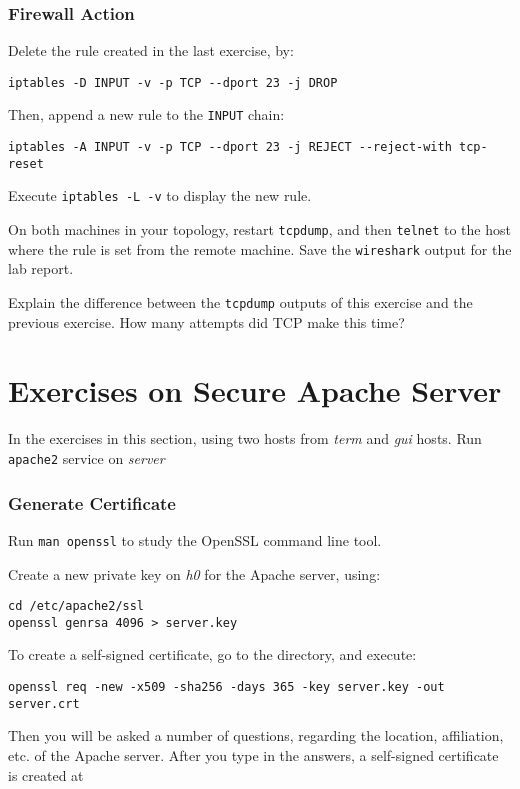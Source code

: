 \documentclass{../UTNetLab}
\begin{document}
\section{Firewall Action}
    Delete the rule created in the last exercise, by:    
    \begin{lstlisting}[morekeywords={[3]INPUT,TCP,DROP}]
iptables -D INPUT -v -p TCP --dport 23 -j DROP
    \end{lstlisting}
    
    Then, append a new rule to the \texttt{INPUT} chain:    
    \begin{lstlisting}[morekeywords={[3]INPUT,TCP,REJECT,tcp-reset}]
iptables -A INPUT -v -p TCP --dport 23 -j REJECT --reject-with tcp-reset
    \end{lstlisting}
    
    Execute \lstinline{iptables -L -v} to display the new rule.

    On both machines in your topology, restart \lstinline{tcpdump}, and then \lstinline{telnet} to the host where the rule is set from the remote machine.
    Save the \lstinline{wireshark} output for the lab report.
    
    \begin{report}
        \item Explain the difference between the \lstinline{tcpdump} outputs of this exercise and the previous exercise.
            How many attempts did {TCP} make this time?
    \end{report}

\part{Exercises on Secure Apache Server}
    In the exercises in this section, using two hosts from \textit{term} and \textit{gui} hosts.
    Run \lstinline{apache2} service on \textit{server}

\section{Generate Certificate}
    Run \lstinline{man openssl} to study the OpenSSL command line tool.

    Create a new private key on \textit{h0} for the Apache server, using:
    \begin{lstlisting}[emph={server,key},morekeywords={[2]genrsa}]
cd /etc/apache2/ssl
openssl genrsa 4096 > server.key
    \end{lstlisting}
    To create a self-signed certificate, go to the  directory, and execute:
    \begin{lstlisting}[emph={server,key,crt},morekeywords={[2]req}]
openssl req -new -x509 -sha256 -days 365 -key server.key -out server.crt
    \end{lstlisting}
    Then you will be asked a number of questions, regarding the location, affiliation, etc.
    of the Apache server.
    After you type in the answers, a self-signed certificate is created at 
\end{document}
